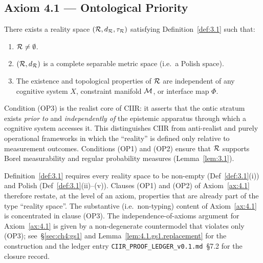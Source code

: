 \subsection{Axiom 4.1 — Ontological Priority}
\label{sec:ch4:ax1}

\begin{axiom}
\label{ax:4.1}
There exists a reality space $(\mathcal{R}, d_{\mathcal{R}}, \tau_{\mathcal{R}})$ satisfying
Definition~\textup{\ref{def:3.1}} such that:
\begin{enumerate}
  \item[\textup{(OP1)}] $\mathcal{R} \neq \emptyset$.
  \item[\textup{(OP2)}] $(\mathcal{R}, d_{\mathcal{R}})$ is a complete separable metric
    space \textup{(}i.e.\ a Polish space\textup{)}.
  \item[\textup{(OP3)}] The existence and topological properties of
    $\mathcal{R}$ are independent of any cognitive system $X$, constraint
    manifold $\mathcal{M}$, or interface map $\Phi$.
\end{enumerate}
\end{axiom}

\begin{remark}
\label{rem:4.1}
Condition (OP3) is the realist core of CIIR: it asserts that the ontic
stratum exists \emph{prior to} and \emph{independently of} the
epistemic apparatus through which a cognitive system accesses it.  This
distinguishes CIIR from anti-realist and purely operational frameworks
in which the ``reality'' is defined only relative to measurement
outcomes.  Conditions (OP1) and (OP2) ensure that $\mathcal{R}$ supports Borel
measurability and regular probability measures
(Lemma~\ref{lem:3.1}).
\end{remark}

\begin{remark}
\label{rem:4.1.substantive}
Definition~\ref{def:3.1} requires every reality space to be
non-empty (Def~\ref{def:3.1}(i)) and Polish
(Def~\ref{def:3.1}(ii)--(v)).  Clauses \textup{(OP1)} and
\textup{(OP2)} of Axiom~\ref{ax:4.1} therefore restate, at the level
of an axiom, properties that are already part of the type ``reality
space''.  The substantive (i.e.\ non-typing) content of
Axiom~\ref{ax:4.1} is concentrated in clause \textup{(OP3)}.  The
independence-of-axioms argument for Axiom~\ref{ax:4.1} is given by a
non-degenerate countermodel that violates only \textup{(OP3)};
see~\S\ref{sec:ch4:gs1} and
Lemma~\ref{lem:4.1.gs1.replacement} for the construction and the
ledger entry \texttt{CIIR\_PROOF\_LEDGER\_v0.1.md}~\S7.2 for the
closure record.
\end{remark}

